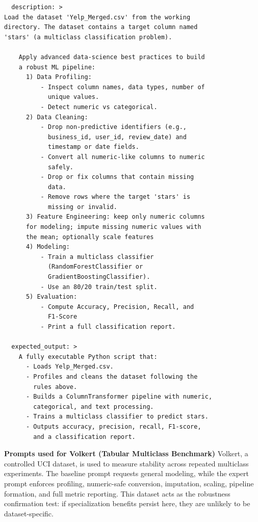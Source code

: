 \begin{tcolorbox}[ left=2pt,   right=2pt,   top=2pt,   bottom=2pt, colback=gray!5,colframe=black!40,title={Expertise instruction prompt}]
\scriptsize
\setlength{\baselineskip}{0.6\baselineskip} \begin{verbatim}
  description: >
Load the dataset 'Yelp_Merged.csv' from the working 
directory. The dataset contains a target column named 
'stars' (a multiclass classification problem).

    Apply advanced data-science best practices to build 
    a robust ML pipeline:
      1) Data Profiling:
          - Inspect column names, data types, number of 
            unique values.
          - Detect numeric vs categorical.
      2) Data Cleaning:
          - Drop non-predictive identifiers (e.g., 
            business_id, user_id, review_date) and 
            timestamp or date fields.
          - Convert all numeric-like columns to numeric 
            safely.
          - Drop or fix columns that contain missing 
            data.
          - Remove rows where the target 'stars' is 
            missing or invalid.
      3) Feature Engineering: keep only numeric columns 
      for modeling; impute missing numeric values with 
      the mean; optionally scale features
      4) Modeling:
          - Train a multiclass classifier 
            (RandomForestClassifier or 
            GradientBoostingClassifier).
          - Use an 80/20 train/test split.
      5) Evaluation:
          - Compute Accuracy, Precision, Recall, and 
            F1-Score
          - Print a full classification report.

  expected_output: >
    A fully executable Python script that:
      - Loads Yelp_Merged.csv.
      - Profiles and cleans the dataset following the 
        rules above.
      - Builds a ColumnTransformer pipeline with numeric, 
        categorical, and text processing.
      - Trains a multiclass classifier to predict stars.
      - Outputs accuracy, precision, recall, F1-score, 
        and a classification report.
\end{verbatim}
\end{tcolorbox}




\newpage


\textbf{Prompts used for Volkert (Tabular Multiclass Benchmark)}  
Volkert, a controlled UCI dataset, is used to measure stability across repeated multiclass experiments.  
The baseline prompt requests general modeling, while the expert prompt enforces profiling, numeric-safe conversion, imputation, scaling, pipeline formation, and full metric reporting. This dataset acts as the robustness confirmation test: if specialization benefits persist here, they are unlikely to be dataset-specific.


